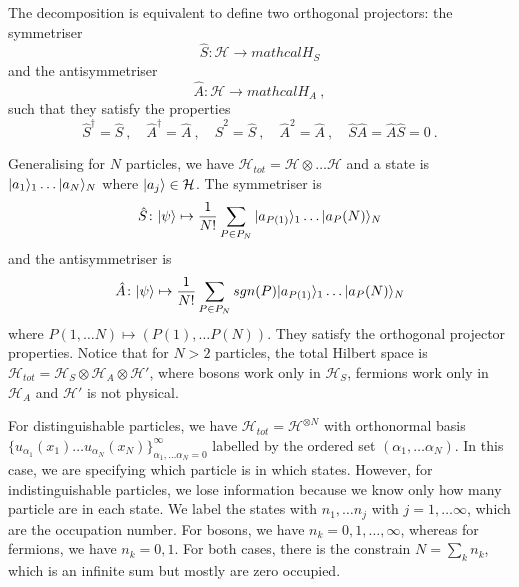    The decomposition is equivalent to define two orthogonal projectors: the symmetriser 
    \begin{equation*}
        \hat S \colon \mathcal H \rightarrow mathcal H_S
    \end{equation*}
    and the antisymmetriser 
    \begin{equation*}
        \hat A \colon \mathcal H \rightarrow mathcal H_A ~,
    \end{equation*}
    such that they satisfy the properties 
    \begin{equation*}
        \hat S^\dagger = \hat S~, \quad \hat A^\dagger = \hat A~, \quad \hat S^2 = \hat S~, \quad \hat A^2 = \hat A~, \quad \hat S \hat A = \hat A \hat S = 0 ~.
    \end{equation*}

    Generalising for $N$ particles, we have $\mathcal H_{tot} = \mathcal H \otimes \ldots \mathcal H$ and a state is $\vert a_1\rangle_1 \ldots \vert a_N\rangle_N$ where $\vert a_j\rangle \in \mathcal H$. The symmetriser is 
    \begin{equation*}
        \hat S \colon \vert\psi\rangle \mapsto \frac{1}{N!} \sum_{P \in P_N} \vert a_{P(1)}\rangle_1 \ldots \vert a_P(N)\rangle_N
    \end{equation*}
    and the antisymmetriser is 
    \begin{equation*}
        \hat A \colon \vert\psi\rangle \mapsto \frac{1}{N!} \sum_{P \in P_N} sgn(P) \vert a_{P(1)}\rangle_1 \ldots \vert a_P(N)\rangle_N
    \end{equation*}
    where $P(1, \ldots N) \mapsto (P(1), \ldots P(N))$. They satisfy the orthogonal projector properties. Notice that for $N > 2$ particles, the total Hilbert space is $\mathcal H_{tot} = \mathcal H_S \otimes \mathcal H_A \otimes \mathcal H'$, where bosons work only in $\mathcal H_S$, fermions work only in $\mathcal H_A$ and $\mathcal H'$ is not physical.

    For distinguishable particles, we have $\mathcal H_{tot} = \mathcal H^{\otimes N}$ with orthonormal basis $\{u_{\alpha_1}(x_1) \ldots u_{\alpha_N}(x_N)\}_{\alpha_1, \ldots \alpha_N=0}^\infty$ labelled by the ordered set $(\alpha_1, \ldots \alpha_N)$. In this case, we are specifying which particle is in which states. However, for indistinguishable particles, we lose information because we know only how many particle are in each state. We label the states with $n_1, \ldots n_j$ with $j=1, \ldots \infty$, which are the occupation number. For bosons, we have $n_k = 0, 1, \ldots, \infty$, whereas for fermions, we have $n_k = 0, 1$. For both cases, there is the constrain $N = \sum_k n_k$, which is an infinite sum but mostly are zero occupied.

